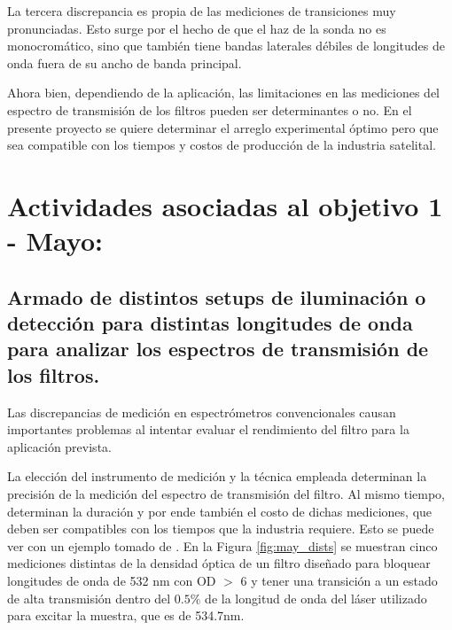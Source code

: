 \documentclass{ctuthesis}
\begin{document}
La tercera 
discrepancia es propia de las mediciones de transiciones muy 
pronunciadas. Esto surge 
por el hecho de que el 
haz de la sonda no es monocromático, sino que también tiene bandas 
laterales débiles de longitudes de onda fuera de su ancho de banda 
principal.




Ahora bien, dependiendo de la aplicación, las limitaciones en las mediciones 
del espectro de transmisión de los filtros pueden ser determinantes o no. En el 
presente proyecto se quiere determinar el arreglo experimental óptimo pero que 
sea compatible con los tiempos y costos de producción de la industria satelital.

\section*{Actividades asociadas al objetivo 1 - Mayo:}
\subsection*{ Armado de distintos setups de iluminación o detección para 
distintas longitudes de onda para analizar los espectros de transmisión de los 
filtros.}


\hspace{0.5cm}Las discrepancias de medición en espectrómetros convencionales 
causan 
importantes problemas al intentar evaluar el rendimiento del filtro para la 
aplicación prevista. 

La elección del instrumento de medición y la técnica 
empleada determinan la precisión de la medición del espectro de transmisión del 
filtro. Al mismo tiempo, determinan la duración y por ende también el costo de 
dichas mediciones, que deben ser compatibles con los tiempos que la industria 
requiere. Esto se puede ver con un ejemplo tomado de \cite{Semrock}. En la 
Figura \ref{fig:may_dists} se muestran cinco mediciones distintas de 
la densidad óptica de un filtro diseñado para bloquear longitudes de onda de 
532 nm con OD $>$ 6 y tener una transición a un estado de alta transmisión 
dentro del $0.5\%$ de la longitud de onda del láser utilizado para excitar la 
muestra, que es de 534.7nm.
\end{document}
